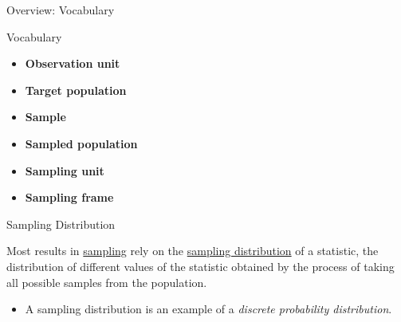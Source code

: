 \documentclass[10pt]{beamer}\usepackage[]{graphicx}\usepackage[]{xcolor}
\begin{document}
\begin{frame}{Overview: Vocabulary}

\begin{block}{Vocabulary}
\begin{itemize}
\item\textbf{Observation unit}
\item \textbf{Target population}
\item \textbf{Sample}
\item \textbf{Sampled population}


\item \textbf{Sampling unit}


\item \textbf{Sampling frame}


\end{itemize}
\end{block}
\end{frame}

\begin{frame}{Sampling Distribution}
\begin{block}{}
Most results in \underline{sampling} rely on the \underline{sampling distribution} of a statistic, the distribution of different values of the statistic obtained by the process of taking all possible samples from the population. 

\begin{itemize}
\item A sampling distribution is an example of a \emph{discrete probability distribution}.
\end{itemize}
\end{block}
\end{frame}
\end{document}
